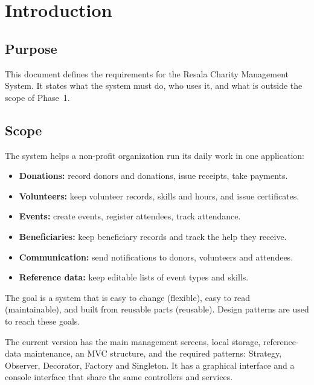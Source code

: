 \section{Introduction}

\subsection{Purpose}

This document defines the requirements for the Resala Charity Management System. It states what the system must do, who uses it, and what is outside the scope of Phase~1.

\subsection{Scope}

The system helps a non-profit organization run its daily work in one application:

\begin{itemize}
  \item \textbf{Donations:} record donors and donations, issue receipts, take payments.
  \item \textbf{Volunteers:} keep volunteer records, skills and hours, and issue certificates.
  \item \textbf{Events:} create events, register attendees, track attendance.
  \item \textbf{Beneficiaries:} keep beneficiary records and track the help they receive.
  \item \textbf{Communication:} send notifications to donors, volunteers and attendees.
  \item \textbf{Reference data:} keep editable lists of event types and skills.
\end{itemize}

The goal is a system that is easy to change (flexible), easy to read (maintainable), and built from reusable parts (reusable). Design patterns are used to reach these goals.

\begin{tcolorbox}[colback=softBlue,colframe=asuBlue,title=Phase 1 scope]
The current version has the main management screens, local storage, reference-data maintenance, an MVC structure, and the required patterns: Strategy, Observer, Decorator, Factory and Singleton. It has a graphical interface and a console interface that share the same controllers and services.
\end{tcolorbox}

